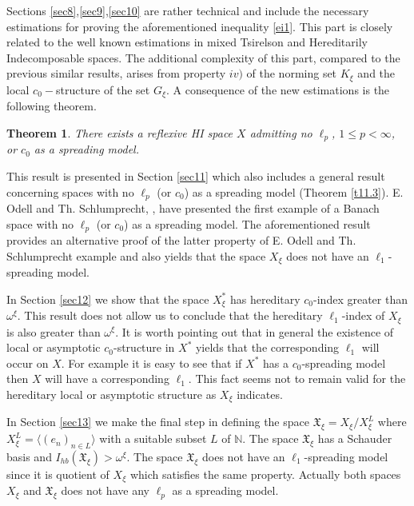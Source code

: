 \documentclass[a4paper]{amsart}
\theoremstyle{plain}
\newtheorem*{thrm}{Theorem}
\newcommand{\N}{\mathbb{N}}
\begin{document}
Sections \ref{sec8},\ref{sec9},\ref{sec10} are rather technical and include the necessary
estimations for proving the aforementioned  inequality \eqref{ei1}. This part is closely
related to the well known estimations in mixed Tsirelson and Hereditarily Indecomposable
spaces.  The additional complexity of this part, compared to the previous similar results,
arises from property $iv)$ of the norming set $K_{\xi}$ and the local $c_{0}-$structure
of the set $G_{\xi}$. A consequence of the new estimations  is the
following theorem.
\begin{thrm} There exists
a reflexive HI space $X$ admitting no $\ell_p$, $1\leq p <\infty$, or $c_0$ as a spreading model.
\end{thrm}
This result is presented in Section  \ref{sec11} which also includes  a general result
concerning spaces with no $\ell_{p}$ (or $c_0$) as a spreading model (Theorem
\ref{t11.3}). E. Odell and Th. Schlumprecht, \cite{OSsm}, have presented the first
example of a Banach space with no $\ell_p$ (or $c_0$) as a spreading model. The
aforementioned result provides an alternative proof of the latter property of E. Odell
and Th. Schlumprecht example and also yields that the space $X_{\xi}$ does not have an
$\ell_{1}$-spreading model.

In Section \ref{sec12} we show   that the space  $X_{\xi}^{*}$  has  hereditary
$c_0$-index  greater than $\omega^{\xi}$. This result does not allow us to conclude that
the hereditary $\ell_{1}$-index of $X_{\xi}$ is also greater than $\omega^{\xi}$. It is
worth pointing out  that  in general the existence of local or asymptotic $c_0$-structure
in $X^{*}$ yields that the corresponding $\ell_{1}$ will occur on $X$.  For example it is
easy to see that  if $X^{*}$  has a $c_0$-spreading model then  $X$ will have a
corresponding $\ell_{1}$. This fact seems not to remain valid for the hereditary local or
asymptotic structure as $X_{\xi}$ indicates.

In Section \ref{sec13}  we make the final step in defining the space
$\mathfrak{X}_{\xi}=X_{\xi}/ X_{\xi}^{L}$ where $X_{\xi}^{L}=\langle(e_n)_{n\in
L}\rangle$ with a suitable subset $L$ of $\N$. The space  $\mathfrak{X}_{\xi}$ has  a
Schauder basis and $I_{hb}(\mathfrak{X}_{\xi})>\omega^{\xi}$. The space
$\mathfrak{X}_{\xi}$  does not have an $\ell_{1}$-spreading model since it is quotient of
$X_{\xi}$ which satisfies the same property. Actually both spaces $X_{\xi}$ and
$\mathfrak{X}_{\xi}$ does not have any $\ell_{p}$ as a spreading model.
\end{document}

